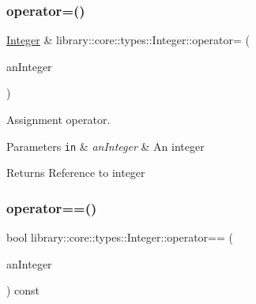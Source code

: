 \mbox{\label{classlibrary_1_1core_1_1types_1_1Integer_ab77cae94a9e6d4a405a555dd55763ea2}} 
\subsubsection{\texorpdfstring{operator=()}{operator=()}}
{\footnotesize\ttfamily \hyperlink{classlibrary_1_1core_1_1types_1_1Integer}{Integer} \& library\+::core\+::types\+::\+Integer\+::operator= (\begin{DoxyParamCaption}\item[{\hyperlink{classlibrary_1_1core_1_1types_1_1Integer_a623afb1580f870fd8a1997b1c12c917d}{Integer\+::\+Value\+Type}}]{an\+Integer }\end{DoxyParamCaption})}



Assignment operator. 


\begin{DoxyParams}[1]{Parameters}
\mbox{\tt in}  & {\em an\+Integer} & An integer \\
\hline
\end{DoxyParams}
\begin{DoxyReturn}{Returns}
Reference to integer 
\end{DoxyReturn}
\mbox{\label{classlibrary_1_1core_1_1types_1_1Integer_a52b3a012d6c6779773d051800daac516}} 
\subsubsection{\texorpdfstring{operator==()}{operator==()}\hspace{0.1cm}{\footnotesize\ttfamily [1/2]}}
{\footnotesize\ttfamily bool library\+::core\+::types\+::\+Integer\+::operator== (\begin{DoxyParamCaption}\item[{const \hyperlink{classlibrary_1_1core_1_1types_1_1Integer}{Integer} \&}]{an\+Integer }\end{DoxyParamCaption}) const}



